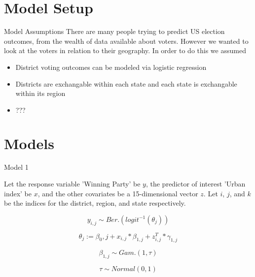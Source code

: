 \documentclass{beamer}
\begin{document}




\section{Model Setup}
\begin{frame}{Model Assumptions}
  There are many people trying to predict US election outcomes, from the wealth of data available about voters. However we wanted to look at the voters in relation to their geography. In order to do this we assumed 
  \begin{itemize}
    \item District voting outcomes can be modeled via logistic regression 
    \item Districts are exchangable within each state and each state is exchangable within its region
    \item ??? 
  \end{itemize}
  \end{frame}





\section{Models}

\begin{frame}{Model 1}

    Let the response variable 'Winning Party' be \(y\), the predictor of interest 'Urban index' be \(x\), and the other covariates be a 15-dimensional vector \(z\). Let \(i\), \(j\), and \(k\) be the indices for the district, region, and state respectively. 

    \[y_{i, j} \sim Ber.(logit^{-1}(\theta_{j}))\]
    
    \[\theta_j := \beta_0, j + x_{i,j} * \beta_{1,j}  + z_{i, j}^T * \gamma_{1,j}\]
    
    \[\beta_{1,j} \sim Gam.(1, \tau)\]
    
    \[\tau \sim Normal(0, 1) \]  %

\end{frame}
\end{document}
